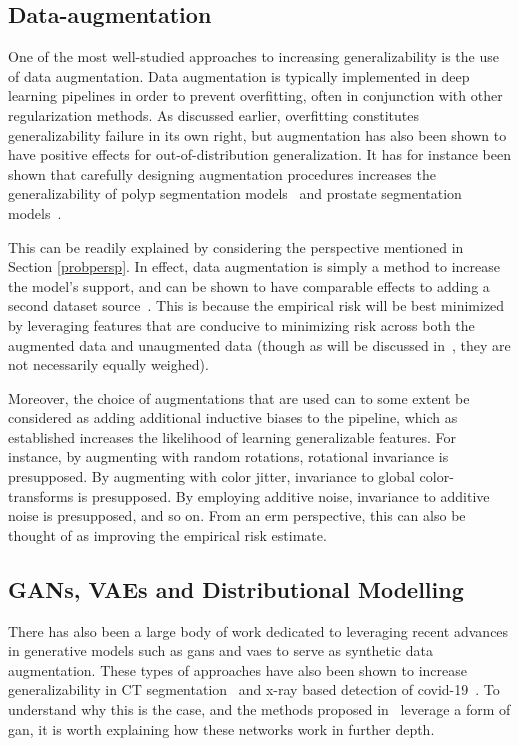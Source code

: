 \subsection{Data-augmentation}
One of the most well-studied approaches to increasing generalizability is the use of data augmentation. Data augmentation is typically
implemented in deep learning pipelines in order to prevent overfitting, often in conjunction with other regularization methods. As discussed earlier, overfitting constitutes generalizability failure in its own right, but augmentation has also been shown to have positive effects for out-of-distribution generalization. It has for instance been shown that carefully designing augmentation procedures increases the generalizability of polyp segmentation models~\cite{polyp_augmentation} and prostate segmentation models~\cite{augmentation_prostate}. 

This can be readily explained by considering the perspective mentioned in Section \ref{probpersp}. In effect, data augmentation is simply a method to increase the model's support, and can be shown to have comparable effects to adding a second dataset source~\cite{generalization_datamod}. This is because the empirical risk will be best minimized by leveraging features that are conducive to minimizing risk across both the augmented data and unaugmented data (though as will be discussed in~, they are not necessarily equally weighed). 

Moreover, the choice of augmentations that are used can to some extent be considered as adding additional inductive biases to the pipeline, which as established increases the likelihood of learning generalizable features. For instance, by augmenting with random rotations, rotational invariance is presupposed. By augmenting with color jitter, invariance to global color-transforms is presupposed.  By employing additive noise, invariance to additive noise is presupposed, and so on. From an \gls{erm} perspective, this can also be thought of as improving the empirical risk estimate. 

\subsection{GANs, VAEs and Distributional Modelling}

There has also been a large body of work dedicated to leveraging recent advances in generative models such as \glspl{gan} and \glspl{vae} to serve as synthetic data augmentation. These types of approaches have also been shown to increase generalizability in CT segmentation~\cite{cyclegan} and x-ray based detection of covid-19~\cite{covid}. To understand why this is the case, and the methods proposed in~ leverage a form of \gls{gan}, it is worth explaining how these networks work in further depth.
